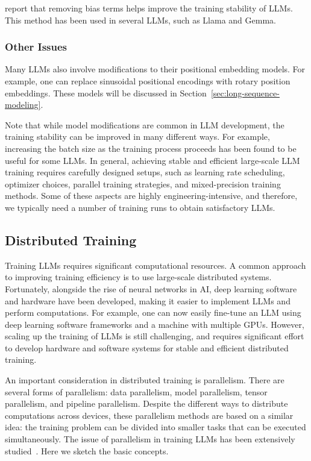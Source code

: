 \citet{chowdhery-etal:2022palm} report that removing bias terms helps improve the training stability of LLMs. This method has been used in several LLMs, such as Llama and Gemma.

\subsubsection{Other Issues}

\noindent Many LLMs also involve modifications to their positional embedding models. For example, one can replace sinusoidal positional encodings with rotary position embeddings. These models will be discussed in Section~\ref{sec:long-sequence-modeling}.

Note that while model modifications are common in LLM development, the training stability can be improved in many different ways. For example, increasing the batch size as the training process proceeds has been found to be useful for some LLMs. In general, achieving stable and efficient large-scale LLM training requires carefully designed setups, such as learning rate scheduling, optimizer choices, parallel training strategies, and mixed-precision training methods. Some of these aspects are highly engineering-intensive, and therefore, we typically need a number of training runs to obtain satisfactory LLMs.

\subsection{Distributed Training}
\label{sec:llm-distributed-training}

\noindent Training LLMs requires significant computational resources. A common approach to improving training efficiency is to use large-scale distributed systems. Fortunately, alongside the rise of neural networks in AI, deep learning software and hardware have been developed, making it easier to implement LLMs and perform computations. For example, one can now easily fine-tune an LLM using deep learning software frameworks and a machine with multiple GPUs. However, scaling up the training of LLMs is still challenging, and requires significant effort to develop hardware and software systems for stable and efficient distributed training.

An important consideration in distributed training is parallelism. There are several forms of parallelism: data parallelism, model parallelism, tensor parallelism, and pipeline parallelism. Despite the different ways to distribute computations across devices, these parallelism methods are based on a similar idea: the training problem can be divided into smaller tasks that can be executed simultaneously. The issue of parallelism in training LLMs has been extensively studied~\cite{narayanan-etal:2021efficient,fedus-etal:2022switch}. Here we sketch the basic concepts.

